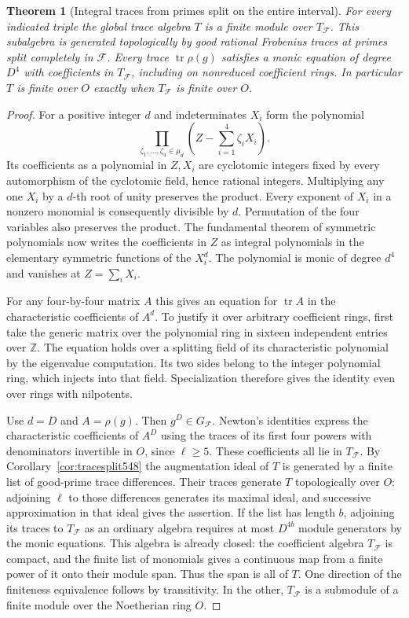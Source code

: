 \documentclass[a4paper,11pt]{article}
\newtheorem{theorem}[proposition]{Theorem}
\theoremstyle{definition}
\theoremstyle{remark}
\newcommand{\ZZ}{\mathbb Z}\newcommand{\ord}{\operatorname{ord}}
\numberwithin{equation}{section}
\begin{document}
\begin{theorem}[Integral traces from primes split on the entire interval]
\leavevmode\label{thm:splitintegral573}
For every indicated triple the global trace algebra \(T\)
is a finite module over \(T_{\mathcal F}\). This subalgebra
is generated topologically by good rational Frobenius traces
at primes split completely in \(\mathcal F\).
Every trace \(\operatorname{tr}\rho(g)\) satisfies a monic
equation of degree \(D^4\) with coefficients in
\(T_{\mathcal F}\), including on nonreduced coefficient
rings. In particular \(T\) is finite over \(O\) exactly
when \(T_{\mathcal F}\) is finite over \(O\).
\end{theorem}
\begin{proof}
For a positive integer \(d\) and indeterminates \(X_i\)
form the polynomial
\[
  \prod_{\zeta_1,\ldots,\zeta_4\in\mu_d}
       \left(Z-\sum_{i=1}^{4}\zeta_i X_i\right).
\]
Its coefficients as a polynomial in \(Z,X_i\) are
cyclotomic integers fixed by every automorphism of the
cyclotomic field, hence rational integers. Multiplying
any one \(X_i\) by a \(d\)-th root of unity preserves
the product. Every exponent of \(X_i\) in a nonzero
monomial is consequently divisible by \(d\). Permutation
of the four variables also preserves the product. The
fundamental theorem of symmetric polynomials now writes
the coefficients in \(Z\) as integral polynomials in
the elementary symmetric functions of the \(X_i^d\).
The polynomial is monic of degree \(d^4\) and vanishes at
\(Z=\sum_i X_i\).

For any four-by-four matrix \(A\) this gives an equation
for \(\operatorname{tr}A\) in the characteristic coefficients
of \(A^d\). To justify it over arbitrary coefficient rings,
first take the generic matrix over the polynomial ring
in sixteen independent entries over \(\ZZ\). The equation
holds over a splitting field of its characteristic polynomial
by the eigenvalue computation. Its two sides belong to
the integer polynomial ring, which injects into that
field. Specialization therefore gives the identity even
over rings with nilpotents.

Use \(d=D\) and \(A=\rho(g)\). Then \(g^D\in G_{\mathcal F}\).
Newton's identities express the characteristic coefficients
of \(A^D\) using the traces of its first four powers with
denominators invertible in \(O\), since \(\ell\ge5\).
These coefficients all lie in \(T_{\mathcal F}\).
By Corollary~\ref{cor:tracesplit548} the augmentation ideal
of \(T\) is generated by a finite list of good-prime trace
differences. Their traces generate \(T\) topologically
over \(O\): adjoining \(\ell\) to those differences
generates its maximal ideal, and successive approximation
in that ideal gives the assertion. If the list has length
\(b\), adjoining its traces to \(T_{\mathcal F}\) as an
ordinary algebra requires at most \(D^{4b}\) module
generators by the monic equations. This algebra is already
closed: the coefficient algebra \(T_{\mathcal F}\) is
compact, and the finite list of monomials gives a continuous
map from a finite power of it onto their module span.
Thus the span is all of \(T\). One direction of the
finiteness equivalence follows by transitivity. In the
other, \(T_{\mathcal F}\) is a submodule of a finite
module over the Noetherian ring \(O\).


\end{proof}
\end{document}
